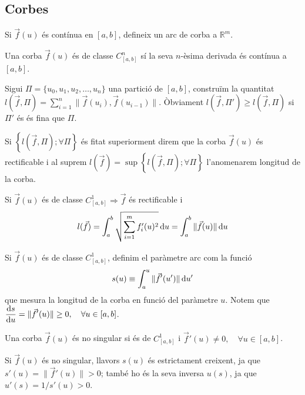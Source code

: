 \subsection{Corbes}
Si $\vec{f}(u)$ és contínua en $[a,b]$, defineix un arc de corba a $\mathbb{R}^{m}$.
\begin{defi}
    Una corba $\vec{f}(u)$ és de classe $C_{[a,b]}^{n}$ sí la seva $n$-èsima derivada és contínua a $[a,b]$.
\end{defi}
\begin{defi}
    Sigui $\Pi = \{u_{0}, u_{1}, u_{2}, \dots, u_{n}\}$ una partició de $[a,b]$, construïm la quantitat $\displaystyle l(\vec{f}, \Pi) = \sum\limits_{i=1}^{n} \| \vec{f}(u_{i}), \vec{f}(u_{i-1}) \|$. Òbviament $l(\vec{f}, \Pi') \geq l(\vec{f}, \Pi)$ si $\Pi'$ és és fina que $\Pi$.
    
    Si $\left\{ l(\vec{f}, \Pi);\forall \Pi \right\}$ és fitat superiorment direm que la corba $\vec{f}(u)$ és rectificable i al suprem $l(\vec{f}) = \sup \left\{ l(\vec{f}, \Pi);\forall \Pi \right\}$ l'anomenarem longitud de la corba.
\end{defi}
\begin{thm}
    Si $\vec{f}(u)$ és de classe $C_{[a,b]}^{1} \Rightarrow \vec{f}$ és rectificable i
    \begin{align}
        l(\vec{f}) = \int_{a}^{b} \sqrt{\sum\limits_{i=1}^{m} f'_{i}(u)^{2}} \mathop{}\!\mathrm{d} u = \int_{a}^{b} \| \vec{f}(u) \| \mathop{}\!\mathrm{d} u
    \end{align}
\end{thm}
\begin{defi}
    Si $\vec{f}(u)$ és de classe $C_{[a,b]}^{1}$, definim el paràmetre arc com la funció
    \begin{align}
        s(u) \equiv \int_{a}^{u} \| \vec{f}'(u') \| \mathop{}\!\mathrm{d} u'
    \end{align}
    que mesura la longitud de la corba en funció del paràmetre $u$. Notem que $\displaystyle \frac{\mathrm{d} s}{\mathrm{d} u} = \| \vec{f}' (u) \| \geq 0, \quad \forall u \in [a,b]$.
\end{defi}
\begin{defi}
    Una corba $\vec{f}(u)$ és no singular si és de $C_{[a,b]}^{1}$ i $\vec{f}'(u) \neq 0, \quad \forall u \in [a,b]$.
    
    Si $\vec{f}(u)$ és no singular, llavors $s(u)$ és estrictament creixent, ja que $s'(u) = \| \vec{f}'(u) \| > 0$; també ho és la seva inversa $u(s)$, ja que $u'(s) = 1/s'(u) > 0$.
\end{defi}

